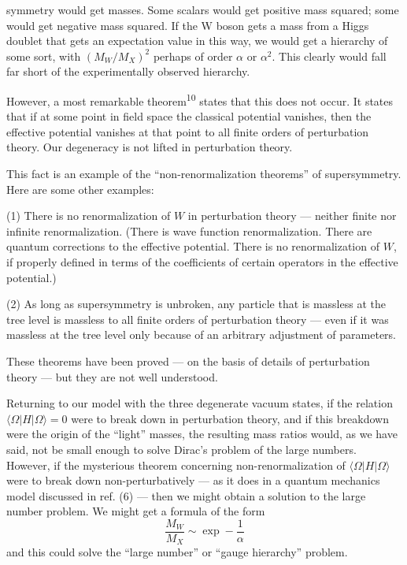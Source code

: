 
symmetry would get masses. Some scalars would get positive mass
squared; some would get negative mass squared. If the W boson gets
a mass from a Higgs doublet that gets an expectation value in this
way, we would get a hierarchy of some sort, with $(M_W/M_X)^2$ perhaps of
order $\alpha$ or $\alpha^2$. This clearly would fall far short of the experimentally
observed hierarchy.

However, a most remarkable theorem\textsuperscript{10} states that this does not
occur. It states that if at some point in field space the classical
potential vanishes, then the effective potential vanishes at that
point to all finite orders of perturbation theory. Our degeneracy
is not lifted in perturbation theory.

This fact is an example of the ``non-renormalization theorems''
of supersymmetry. Here are some other examples:

(1) There is no renormalization of $W$ in perturbation theory ---
neither finite nor infinite renormalization. (There is wave function
renormalization. There are quantum corrections to the effective
potential. There is no renormalization of $W$, if properly defined in
terms of the coefficients of certain operators in the effective
potential.)

(2) As long as supersymmetry is unbroken, any particle that is
massless at the tree level is massless to all finite orders of perturbation
theory --- even if it was massless at the tree level only
because of an arbitrary adjustment of parameters.

These theorems have been proved --- on the basis of details of
perturbation theory --- but they are not well understood.

Returning to our model with the three degenerate vacuum states,
if the relation $\langle \Omega| H |\Omega \rangle = 0$ were to break down in perturbation
theory, and if this breakdown were the origin of the ``light'' masses,
the resulting mass ratios would, as we have said, not be small enough
to solve Dirac's problem of the large numbers. However, if the mysterious
theorem concerning non-renormalization of $\langle \Omega| H |\Omega \rangle$ were to
break down non-perturbatively --- as it does in a quantum mechanics
model discussed in ref. (6) --- then we might obtain a solution to
the large number problem. We might get a formula of the form
\begin{equation}
\frac{M_W}{M_X} \sim \exp - \frac{1}{\alpha}
\tag{28}
\end{equation}
and this could solve the ``large number'' or ``gauge hierarchy'' problem.

